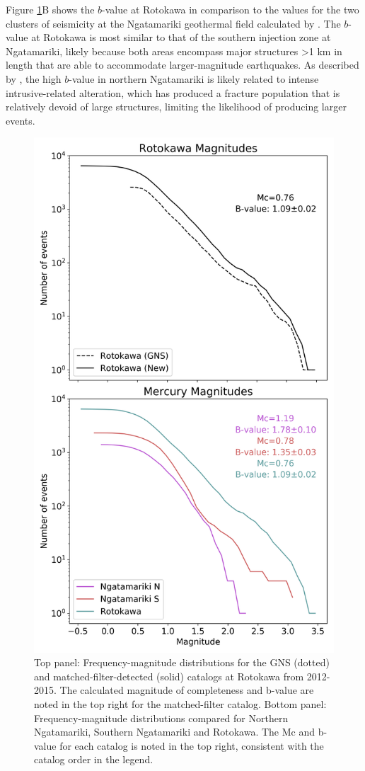Figure \ref{848333}B shows the $b$-value at Rotokawa in comparison to the values for the two clusters of seismicity at the Ngatamariki geothermal field calculated by \citet{j2019}. The $b$-value at Rotokawa is most similar to that of the southern injection zone at Ngatamariki, likely because both areas encompass major structures \textgreater1 km in length that are able to accommodate larger-magnitude earthquakes. As described by \citet{j2019}, the high $b$-value in northern Ngatamariki is likely related to intense intrusive-related alteration, which has produced a fracture population that is relatively devoid of large structures, limiting the likelihood of producing larger events.

\begin{figure}[h!]
\begin{center}
\includegraphics[width=0.70\columnwidth]{Chapter_4_Rot/figures/Rot_cumulative_bval_plot/Merc_cumulative_bval_all_2-panel_original}
\caption{{Top panel: Frequency-magnitude distributions for the GNS (dotted) and
matched-filter-detected (solid) catalogs at Rotokawa from 2012-2015. The
calculated magnitude of completeness and b-value are noted in the top
right for the matched-filter catalog. Bottom panel: Frequency-magnitude
distributions compared for Northern Ngatamariki, Southern Ngatamariki
and Rotokawa. The Mc and b-value for each catalog is noted in the top
right, consistent with the catalog order in the legend.
{\label{848333}}%
}}
\end{center}
\end{figure}

